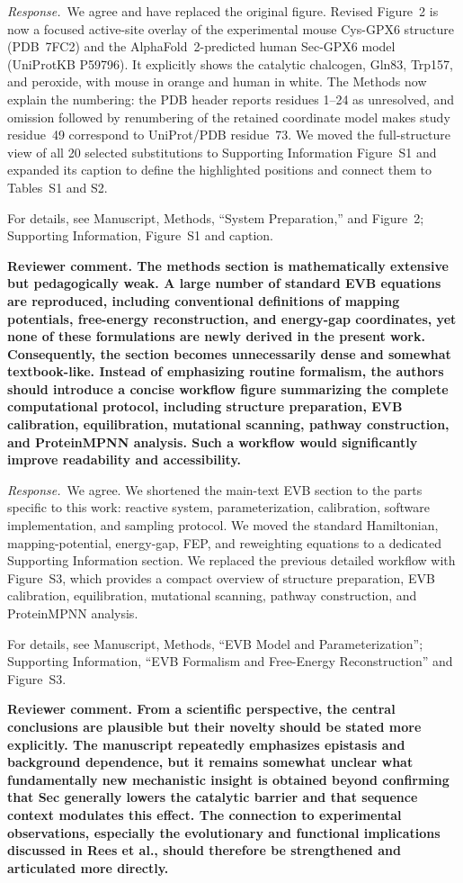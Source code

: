\documentclass[11pt]{article}
\newcommand{\ReviewerComment}[1]{\par\noindent\textbf{Reviewer comment. #1}\par}
\newcommand{\AuthorResponse}{\par\noindent\textit{Response.}\ }
\newcommand{\Location}[1]{\par\noindent For details, see #1\par}
\begin{document}
\AuthorResponse We agree and have replaced the original figure. Revised Figure~2 is now a
focused active-site overlay of the experimental mouse Cys-GPX6 structure (PDB~7FC2) and
the AlphaFold~2-predicted human Sec-GPX6 model (UniProtKB P59796). It explicitly shows
the catalytic chalcogen, Gln83, Trp157, and peroxide, with mouse in orange and human in
white. The Methods now explain the numbering: the PDB header reports residues 1--24 as
unresolved, and omission followed by renumbering of the retained coordinate model makes
study residue~49 correspond to UniProt/PDB residue~73. We moved the full-structure view
of all 20 selected substitutions to Supporting Information Figure~S1 and expanded its
caption to define the highlighted positions and connect them to Tables~S1 and S2.

\Location{Manuscript, Methods, ``System Preparation,'' and Figure~2; Supporting Information, Figure~S1 and caption.}

\ReviewerComment{The methods section is mathematically extensive but pedagogically weak. A large number of standard EVB equations are reproduced, including conventional definitions of mapping potentials, free-energy reconstruction, and energy-gap coordinates, yet none of these formulations are newly derived in the present work. Consequently, the section becomes unnecessarily dense and somewhat textbook-like. Instead of emphasizing routine formalism, the authors should introduce a concise workflow figure summarizing the complete computational protocol, including structure preparation, EVB calibration, equilibration, mutational scanning, pathway construction, and ProteinMPNN analysis. Such a workflow would significantly improve readability and accessibility.}

\AuthorResponse We agree. We shortened the main-text EVB section to the parts specific to this work:
reactive system, parameterization, calibration, software implementation, and sampling
protocol. We moved the standard Hamiltonian, mapping-potential, energy-gap, FEP, and
reweighting equations to a dedicated Supporting Information section. We replaced the
previous detailed workflow with Figure~S3, which provides a compact overview of structure
preparation, EVB calibration, equilibration,
mutational scanning, pathway construction, and ProteinMPNN analysis.

\Location{Manuscript, Methods, ``EVB Model and Parameterization''; Supporting Information, ``EVB Formalism and Free-Energy Reconstruction'' and Figure~S3.}

\ReviewerComment{From a scientific perspective, the central conclusions are plausible but their novelty should be stated more explicitly. The manuscript repeatedly emphasizes epistasis and background dependence, but it remains somewhat unclear what fundamentally new mechanistic insight is obtained beyond confirming that Sec generally lowers the catalytic barrier and that sequence context modulates this effect. The connection to experimental observations, especially the evolutionary and functional implications discussed in Rees et al., should therefore be strengthened and articulated more directly.}
\end{document}
